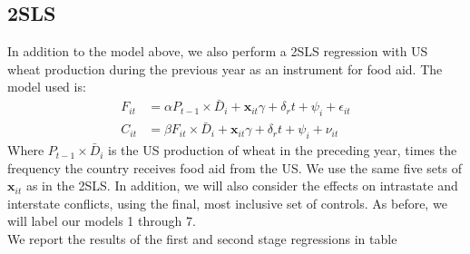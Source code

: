 \documentclass{article}
\newcommand{\x}{\mathbf x}
\begin{document}
\subsection{2SLS }
In addition to the model above, we also perform a 2SLS regression with US wheat production during the previous year as an instrument for food aid. The model used is:
\begin{align*}
F_{it} &= \alpha P_{t-1}\times \bar D_{i} +  \x_{it} \gamma +  \delta_r t + \psi_{i} + \epsilon_{it}\\
C_{it} &= \beta  F_{it} \times \bar D_{i}+ \x_{it} \gamma +  \delta_r t + \psi_{i} + \nu_{it}
\end{align*}
Where $P_{t-1}\times \bar D_{i}$ is the US production of wheat in the preceding year, times the frequency the country receives food aid from the US. We use the same five sets of $\x_{it}$ as in the 2SLS. In addition, we will also consider the effects on intrastate and interstate conflicts, using the final, most inclusive set of controls. As before, we will label our models 1 through 7. \\

We report the results of the first and second stage regressions in table 
\end{document}

